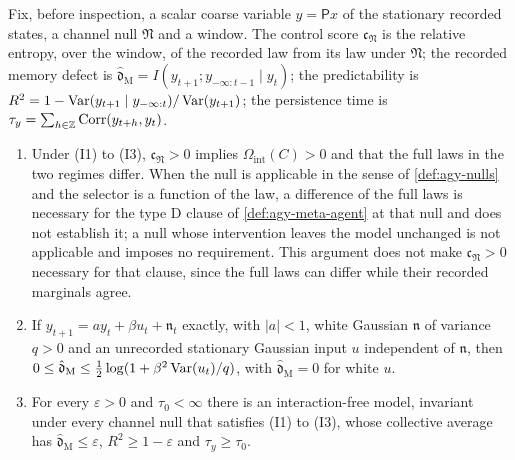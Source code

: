 \begin{definition}\label{def:idn-recorded-grade}
Fix, before inspection, a scalar coarse variable $y=\mathsf Px$ of the stationary recorded states, a channel null $\mathfrak N$ and a window. The control score $\mathfrak c_{\mathfrak N}$ is the relative entropy, over the window, of the recorded law from its law under $\mathfrak N$; the recorded memory defect is $\hat{\mathfrak d}_{\mathrm M}=I(y_{t+1};y_{-\infty:t-1}\mid y_t)$; the predictability is $R^2=1-\operatorname{Var}(y_{t+1}\mid y_{-\infty:t})/\operatorname{Var}(y_{t+1})$; the persistence time is $\tau_y=\sum_{h\in\mathbb{Z}}\operatorname{Corr}(y_{t+h},y_t)$.
\end{definition}

\begin{proposition}\label{prop:idn-grade}
\begin{enumerate}
\item[(a)] Under (I1) to (I3), $\mathfrak c_{\mathfrak N}>0$ implies $\Omega_{\mathrm{int}}(C)>0$ and that the full laws in the two regimes differ. When the null is applicable in the sense of \cref{def:agy-nulls} and the selector is a function of the law, a difference of the full laws is necessary for the type D clause of \cref{def:agy-meta-agent} at that null and does not establish it; a null whose intervention leaves the model unchanged is not applicable and imposes no requirement. This argument does not make $\mathfrak c_{\mathfrak N}>0$ necessary for that clause, since the full laws can differ while their recorded marginals agree.
\item[(b)] If $y_{t+1}=ay_t+\beta u_t+\mathfrak n_t$ exactly, with $|a|<1$, white Gaussian $\mathfrak n$ of variance $q>0$ and an unrecorded stationary Gaussian input $u$ independent of $\mathfrak n$, then $0\le\hat{\mathfrak d}_{\mathrm M}\le\tfrac12\log(1+\beta^2\operatorname{Var}(u_t)/q)$, with $\hat{\mathfrak d}_{\mathrm M}=0$ for white $u$.
\item[(c)] For every $\varepsilon>0$ and $\tau_0<\infty$ there is an interaction-free model, invariant under every channel null that satisfies (I1) to (I3), whose collective average has $\hat{\mathfrak d}_{\mathrm M}\le\varepsilon$, $R^2\ge1-\varepsilon$ and $\tau_y\ge\tau_0$.
\end{enumerate}
\end{proposition}

